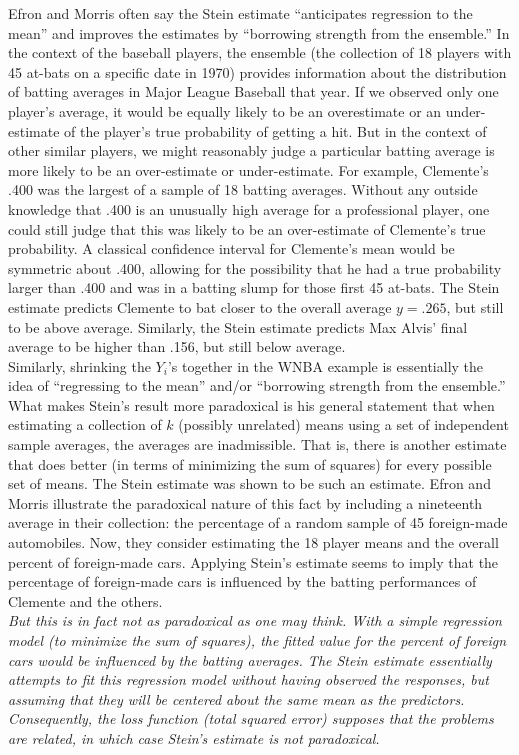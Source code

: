 \begin{enumerate}[a)]
    Efron and Morris often say the Stein estimate ``anticipates regression to the
    mean'' and improves the estimates by ``borrowing strength from the ensemble.''
    In the context of the baseball players, the ensemble (the collection of 18 players with 45 at-bats on a specific date
    in 1970) provides information about the distribution of batting averages in
    Major League Baseball that year. If we observed only one player's average, it
    would be equally likely to be an overestimate or an under-estimate of the
    player's true probability of getting a hit. But in the context of other similar players, we might reasonably judge a particular batting average is more likely to be an over-estimate or under-estimate. For example, Clemente's .400 was the largest of a sample of 18 batting averages.
    Without any outside knowledge that .400 is an unusually high average for a professional player, one could still judge that this was likely to be an over-estimate of Clemente's true probability. A classical confidence interval for Clemente's mean would be symmetric about .400, allowing for the possibility that he had a true probability larger than .400 and was in a batting slump for those first 45 at-bats. The Stein estimate predicts Clemente to bat closer to the overall average $y =.265$, but still to be above average. Similarly, the Stein estimate predicts Max Alvis' final average to be higher
    than .156, but still below average. \\

    Similarly, shrinking the $Y_i$'s together in the WNBA example is essentially the idea of ``regressing to the mean'' and/or ``borrowing strength from the ensemble.'' \\

    What makes Stein's result more paradoxical is his general statement that when estimating a collection of $k$ (possibly unrelated) means using a set of independent sample averages, the averages are inadmissible. That is, there is another estimate that does better (in terms of minimizing the sum of squares) for every possible set of means. The Stein estimate was shown to be such an estimate. Efron and Morris illustrate the paradoxical nature of this fact by including a nineteenth average in their collection: the percentage of a random sample of 45 foreign-made automobiles. Now, they consider estimating the 18 player means and the overall percent of foreign-made cars. Applying Stein's estimate seems to imply that the percentage of foreign-made cars is influenced by the batting performances of Clemente and the others. \\

    \textit{But this is in fact not as paradoxical as one may think. With a simple regression model (to minimize the sum of squares), the fitted value for the percent of foreign cars would be influenced by the batting averages. The Stein estimate essentially attempts to fit this regression model without having observed the responses, but assuming that they will be centered about the same mean as the predictors. Consequently, the loss function (total squared error) supposes that the problems are related, in which case Stein's estimate is not paradoxical.}
\end{enumerate}
